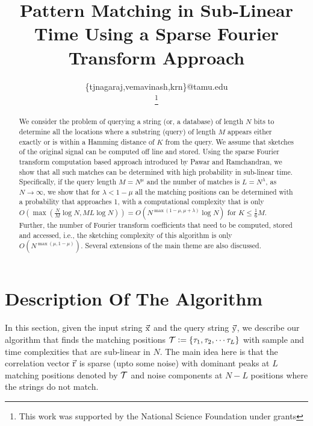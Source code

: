 \documentclass[journal,11pt,onecolumn]{IEEEtran}  %
\title{\LARGE \bf
Pattern Matching in Sub-Linear Time Using a Sparse Fourier Transform Approach
}
\author{\IEEEauthorblockN{Nagaraj T. Janakiraman, Avinash Vem, Krishna R. Narayanan \\}
\IEEEauthorblockA{Department of Electrical \& Comp. Engg., Texas A\&M University, College Station, TX, U.S.A\\}
\{tjnagaraj,vemavinash,krn\}@tamu.edu\\
\thanks{This work was supported by the National Science Foundation under grants}
}
\begin{document}
\maketitle
\thispagestyle{empty}
\pagestyle{empty}

\begin{abstract}
We consider the problem of querying a string (or, a database) of length $N$ bits to determine all the locations where a substring (query) of length $M$ appears either exactly or is within a Hamming distance of $K$ from the query. We assume that sketches of the original signal can be computed off line and stored. Using the sparse Fourier transform computation based approach introduced by Pawar and Ramchandran, we show that all such matches can be determined with high probability in sub-linear time. Specifically, if the query length $M = N^\mu$ and the number of matches is $L=N^\lambda$, as $N \rightarrow \infty$, we show that  for $\lambda < 1-\mu$ all the matching positions can be determined with a probability that approaches 1, with a computational complexity that is only $O\left(\max \left(\frac{N}{M} \log N, M L \log N \right) \right) = O\left(N^{\max(1-\mu,\mu+\lambda)} \log N \right)$ for $K \leq \frac{1}{6}M$. Further, the number of Fourier transform coefficients that need to be computed, stored and accessed, i.e., the sketching complexity of this algorithm is only $O\left( N^{\max(\mu,1-\mu)}\right)$. Several extensions of the main theme are also discussed.
\end{abstract}


% 
\section{Description Of The Algorithm}
\label{sec:Algo_desc}
In this section, given the input string $\vec{\mathrm{x}}$ and the query string $\vec{\mathrm{y}}$, we describe our algorithm that finds the matching positions $\mathcal{T}\mathrel{\mathop:}= \{\tau_1, \tau_2, \cdots \tau_L\}$ with sample and time complexities that are sub-linear in $N$. The main idea here is that the correlation vector $\vec{\mathrm{r}}$ is sparse (upto some noise) with dominant peaks at $L$ matching positions denoted by $\mathcal{T}$ and noise components at $N-L$ positions where the strings do not match. 

\begin{figure}[h!]
	\begin{center}
	 	\resizebox{0.75\textwidth}{!}{}	
	\end{center}	   
	\caption{}\label{fig:notional}
	\vspace{5 pt}
\end{figure}
\end{document}
